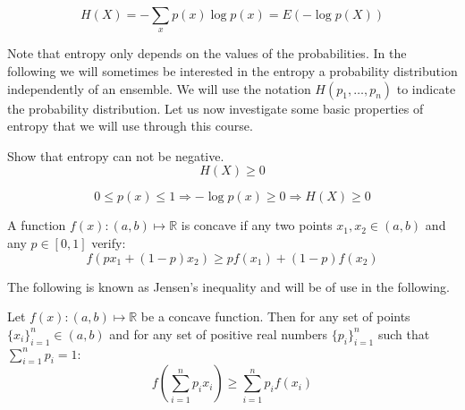 \begin{equation}
  \label{eq:mean}
  H({X})=-\sum_{x} p(x)\log p(x) = E(-\log p({X}))
\end{equation}

Note that entropy only depends on the values of the probabilities. In the following we will sometimes be interested in the entropy a probability distribution independently of an ensemble. We will use the notation $H(p_1,\ldots,p_n)$ to indicate the probability distribution. Let us now investigate some basic properties of entropy that we will use through this course.

\begin{exercise}Show that entropy can not be negative.
  \label{lem:entropynonnegative}
  \begin{equation*}
    H({X})\geq 0
  \end{equation*}
\end{exercise}
\begin{solution}
  \begin{equation}
    0 \leq p(x) \leq 1 \Rightarrow -\log p(x) \geq 0 \Rightarrow H(X) \geq 0
  \end{equation}
\end{solution}
\begin{definition} A function $f(x):(a,b)\mapsto\mathbb R$ is concave if any two points $x_1,x_2\in(a,b)$ and any $p\in[0,1]$ verify:
        \begin{equation}
        f(px_1+(1-p)x_2) \geq pf(x_1)+(1-p)f(x_2)
         \end{equation}
\end{definition}

The following is known as Jensen's inequality and will be of use in the following. 
\begin{theorem} Let $f(x):(a,b)\mapsto\mathbb R$ be a concave function. Then for any set of points $\{x_i\}_{i=1}^n\in(a,b)$ and for any set of positive real numbers $\{p_i\}_{i=1}^n$ such that $\sum_{i=1}^np_i=1$: 
  \label{th:jensen}
  \begin{equation*}
 f\left(\sum_{i=1}^np_ix_i\right) \geq \sum_{i=1}^np_if(x_i) 
  \end{equation*}
\end{theorem}

